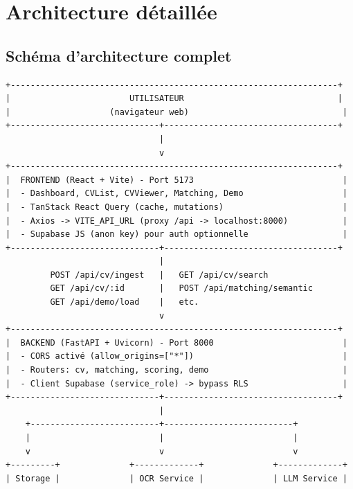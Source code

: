 \documentclass[11pt,a4paper]{report}
\begin{document}
\chapter{Architecture détaillée}

\section{Schéma d'architecture complet}

\begin{lstlisting}[caption={Architecture système (vue globale)}, language=text]
+------------------------------------------------------------------+
|                        UTILISATEUR                               |
|                    (navigateur web)                               |
+------------------------------+-----------------------------------+
                               |
                               v
+------------------------------------------------------------------+
|  FRONTEND (React + Vite) - Port 5173                              |
|  - Dashboard, CVList, CVViewer, Matching, Demo                    |
|  - TanStack React Query (cache, mutations)                        |
|  - Axios -> VITE_API_URL (proxy /api -> localhost:8000)           |
|  - Supabase JS (anon key) pour auth optionnelle                   |
+------------------------------+-----------------------------------+
                               |
         POST /api/cv/ingest   |   GET /api/cv/search
         GET /api/cv/:id       |   POST /api/matching/semantic
         GET /api/demo/load    |   etc.
                               v
+------------------------------------------------------------------+
|  BACKEND (FastAPI + Uvicorn) - Port 8000                          |
|  - CORS activé (allow_origins=["*"])                              |
|  - Routers: cv, matching, scoring, demo                           |
|  - Client Supabase (service_role) -> bypass RLS                   |
+------------------------------+-----------------------------------+
                               |
    +--------------------------+--------------------------+
    |                          |                          |
    v                          v                          v
+---------+              +-------------+              +-------------+
| Storage |              | OCR Service |              | LLM Service |

\end{lstlisting}
\end{document}
